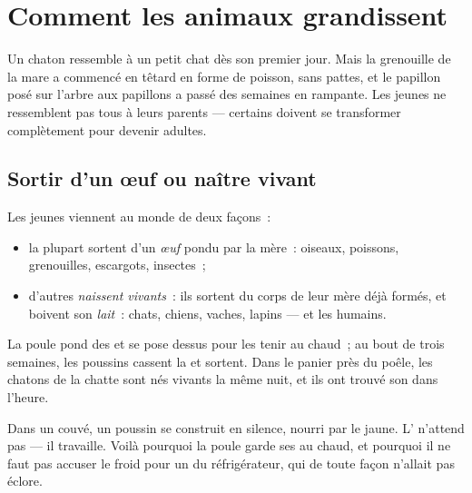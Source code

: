 \chapter{Comment les animaux grandissent}\label{ch:g2:animals-grow-up}

Un chaton ressemble à un petit chat dès son premier jour. Mais la
grenouille de la mare a commencé en têtard en forme de poisson, sans
pattes, et le papillon posé sur l'arbre aux papillons a passé des
semaines en  rampante. Les jeunes  ne ressemblent pas
tous à leurs parents --- certains doivent se transformer
complètement pour devenir adultes.

\section{Sortir d'un œuf ou naître vivant}

\begin{definition}\label{def:g2:animals-grow-up:born}
Les jeunes  viennent au monde de deux façons~:
\begin{itemize}
  \item la plupart sortent d'un \emph{œuf} pondu par la
        mère~: oiseaux, poissons, grenouilles, escargots, insectes~;
  \item d'autres \emph{naissent vivants}~: ils
        sortent du corps de leur mère déjà formés, et boivent son
        \emph{lait}~: chats, chiens, vaches, lapins ---
        et les humains.
\end{itemize}
\end{definition}

\begin{example}\label{ex:g2:animals-grow-up:henhouse}
La poule pond des  et se pose dessus pour les tenir au chaud~;
au bout de trois semaines, les poussins cassent la  et
sortent. Dans le panier près du poêle, les chatons de la chatte sont
nés vivants la même nuit, et ils ont trouvé son  dans l'heure.
\end{example}

\begin{remark}\label{rem:g2:animals-grow-up:egg}
Dans un  couvé, un poussin se construit en silence, nourri par le
jaune. L' n'attend pas --- il travaille. Voilà pourquoi la poule
garde ses  au chaud, et pourquoi il ne faut pas accuser le froid
pour un  du réfrigérateur, qui de toute façon n'allait pas
éclore.
\end{remark}


